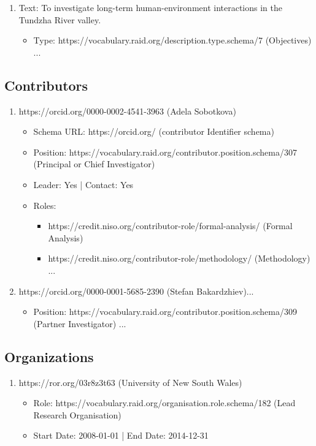 \begin{framed}
{\begin{enumerate}
\item Text: To investigate long-term human-environment interactions in the Tundzha River valley.
   \begin{itemize}
   \item Type: https://vocabulary.raid.org/description.type.schema/7 (Objectives) ...
   \end{itemize}

\end{enumerate}

\subsection*{Contributors}
\begin{enumerate}

\item https://orcid.org/0000-0002-4541-3963 (Adela Sobotkova)
   \begin{itemize}
   \item Schema URL: https://orcid.org/ (contributor Identifier schema)
   \item Position: https://vocabulary.raid.org/contributor.position.schema/307 (Principal or Chief Investigator)
   \item Leader: Yes | Contact: Yes
   \item Roles:
   \begin{itemize}
   \item https://credit.niso.org/contributor-role/formal-analysis/ (Formal Analysis)
   \item https://credit.niso.org/contributor-role/methodology/ (Methodology) ...
   \end{itemize}
   \end{itemize}

\item https://orcid.org/0000-0001-5685-2390 (Stefan Bakardzhiev)...
   \begin{itemize}
   \item Position: https://vocabulary.raid.org/contributor.position.schema/309 (Partner Investigator) ...
   \end{itemize}
\end{enumerate}

\subsection*{Organizations}
\begin{enumerate}
\item https://ror.org/03r8z3t63 (University of New South Wales)
   \begin{itemize}
   \item Role: https://vocabulary.raid.org/organisation.role.schema/182 (Lead Research Organisation)
   \item Start Date: 2008-01-01 | End Date: 2014-12-31
   \end{itemize}


\end{enumerate}}
\end{framed}
